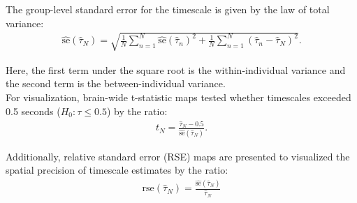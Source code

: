 \documentclass[latex/main.tex]{subfiles}
\begin{document}
\noindent The group-level standard error for the timescale is given by the law of total variance:
\begin{align}
    \widehat{\text{se}}(\hat\tau_N) = \sqrt{\frac{1}{N} \sum_{n=1}^N \widehat{\text{se}}(\hat\tau_n)^2 + \frac{1}{N} \sum_{n=1}^N (\hat\tau_n - \hat\tau_N)^2}.
\end{align}

\noindent Here, the first term under the square root is the within-individual variance and the second term is the between-individual variance.\\

For visualization, brain-wide t-statistic maps tested whether timescales exceeded 0.5 seconds ($H_0: \tau \leq 0.5$) by the ratio:
\begin{align}\label{eq:t-ratio}
    t_N = \frac{\hat\tau_N-0.5}{\widehat{\text{se}}(\hat\tau_N)}.
\end{align}

\noindent Additionally, relative standard error (RSE) maps are presented to visualized the spatial precision of timescale estimates by the ratio:
\begin{align}
    \text{rse}(\hat\tau_N) = \frac{\widehat{\text{se}}(\hat\tau_N)}{\hat\tau_N}
\end{align}
\end{document}
